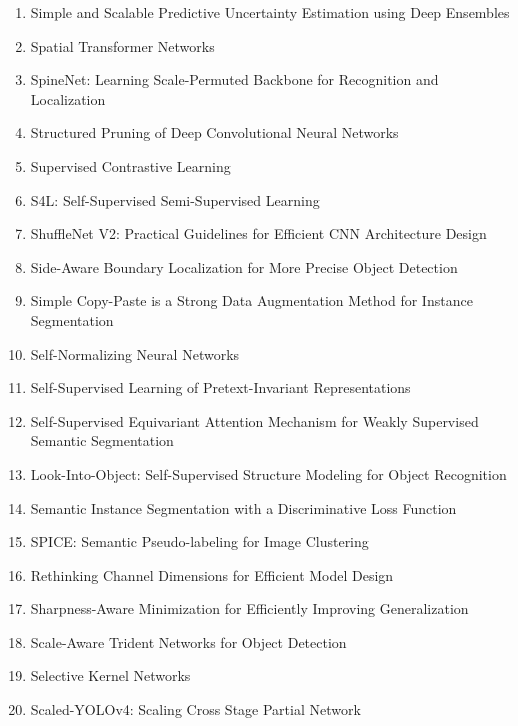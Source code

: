 \documentclass[acmlarge]{acmart}
\begin{document}
\begin{enumerate}
	\item Simple and Scalable Predictive Uncertainty Estimation using Deep Ensembles \cite{Lakshminarayanan2017SimpleAS}
	\item Spatial Transformer Networks \cite{Jaderberg2015SpatialTN}
	\item SpineNet: Learning Scale-Permuted Backbone for Recognition and Localization \cite{Du2020SpineNetLS}
	\item Structured Pruning of Deep Convolutional Neural Networks \cite{Anwar2017StructuredPO}
	\item Supervised Contrastive Learning \cite{Khosla2020SupervisedCL}
	\item S4L: Self-Supervised Semi-Supervised Learning \cite{Zhai2019S4LSS}
	\item ShuffleNet V2: Practical Guidelines for Efficient CNN Architecture Design \cite{Ma2018ShuffleNetVP}
	\item Side-Aware Boundary Localization for More Precise Object Detection \cite{Wang2020SideAwareBL}
	\item Simple Copy-Paste is a Strong Data Augmentation Method for Instance Segmentation \cite{Ghiasi2021SimpleCI}
	\item Self-Normalizing Neural Networks \cite{Klambauer2017SelfNormalizingNN}
	\item Self-Supervised Learning of Pretext-Invariant Representations \cite{Misra2020SelfSupervisedLO}
	\item Self-Supervised Equivariant Attention Mechanism for Weakly Supervised Semantic Segmentation \cite{Wang2020SelfSupervisedEA}
	\item Look-Into-Object: Self-Supervised Structure Modeling for Object Recognition \cite{Zhou2020LookIntoObjectSS}
	\item Semantic Instance Segmentation with a Discriminative Loss Function \cite{Brabandere2017SemanticIS}
	\item SPICE: Semantic Pseudo-labeling for Image Clustering \cite{Niu2021SPICESP}
	\item Rethinking Channel Dimensions for Efficient Model Design \cite{Han2021RethinkingCD}
	\item Sharpness-Aware Minimization for Efficiently Improving Generalization \cite{Foret2021SharpnessAwareMF}
	\item Scale-Aware Trident Networks for Object Detection \cite{Li2019ScaleAwareTN}
	\item Selective Kernel Networks \cite{Li2019SelectiveKN}
	\item Scaled-YOLOv4: Scaling Cross Stage Partial Network \cite{Wang2021ScaledYOLOv4SC}

\end{enumerate}
\end{document}
